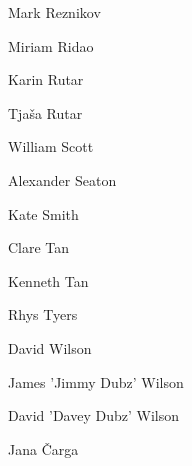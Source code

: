 \begin{tcolorbox}
\begin{fullwidth}
\begin{multicols}{2}
Mark Reznikov  
 
Miriam Ridao 
 
Karin Rutar 
 
Tja\v{s}a Rutar 
 
William Scott 
 
Alexander Seaton 
 
Kate Smith 
 
Clare Tan 
 
Kenneth Tan 
 
Rhys Tyers 
 
David Wilson 
 
James 'Jimmy Dubz' Wilson 
 
David 'Davey Dubz' Wilson  
 
Jana \v{C}arga 
 
\end{multicols} 
 \end{fullwidth} 
 \end{tcolorbox} 
